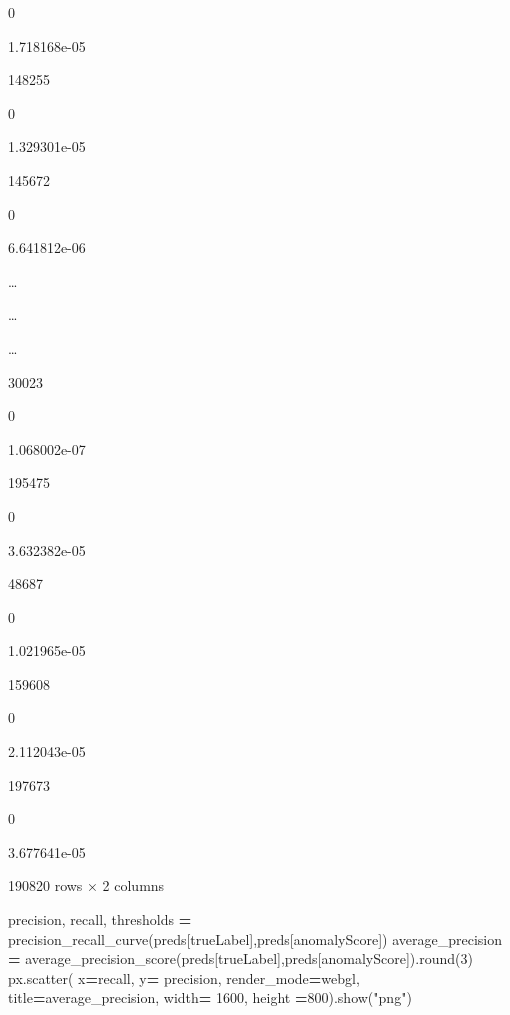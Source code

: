 \documentclass[
]{article}
\newenvironment{Shaded}{\begin{snugshade}}{\end{snugshade}}
\newcommand{\BuiltInTok}[1]{#1}
\newcommand{\DecValTok}[1]{\textcolor[rgb]{0.00,0.00,0.81}{#1}}
\newcommand{\NormalTok}[1]{#1}
\newcommand{\OperatorTok}[1]{\textcolor[rgb]{0.81,0.36,0.00}{\textbf{#1}}}
\newcommand{\StringTok}[1]{\textcolor[rgb]{0.31,0.60,0.02}{#1}}
\begin{document}
0

1.718168e-05

148255

0

1.329301e-05

145672

0

6.641812e-06

\ldots{}

\ldots{}

\ldots{}

30023

0

1.068002e-07

195475

0

3.632382e-05

48687

0

1.021965e-05

159608

0

2.112043e-05

197673

0

3.677641e-05

190820 rows × 2 columns

\begin{Shaded}
\begin{Highlighting}[]
\NormalTok{precision, recall, thresholds }\OperatorTok{=}\NormalTok{  precision\_recall\_curve(preds[}\StringTok{\textquotesingle{}trueLabel\textquotesingle{}}\NormalTok{],preds[}\StringTok{\textquotesingle{}anomalyScore\textquotesingle{}}\NormalTok{])}
\NormalTok{average\_precision }\OperatorTok{=}\NormalTok{  average\_precision\_score(preds[}\StringTok{\textquotesingle{}trueLabel\textquotesingle{}}\NormalTok{],preds[}\StringTok{\textquotesingle{}anomalyScore\textquotesingle{}}\NormalTok{]).}\BuiltInTok{round}\NormalTok{(}\DecValTok{3}\NormalTok{)}
\NormalTok{px.scatter( x}\OperatorTok{=}\NormalTok{recall, y}\OperatorTok{=}\NormalTok{ precision, render\_mode}\OperatorTok{=}\StringTok{\textquotesingle{}webgl\textquotesingle{}}\NormalTok{, title}\OperatorTok{=}\NormalTok{average\_precision, width}\OperatorTok{=} \DecValTok{1600}\NormalTok{, height }\OperatorTok{=}\DecValTok{800}\NormalTok{).show(}\StringTok{"png"}\NormalTok{)}
\end{Highlighting}
\end{Shaded}
\end{document}
